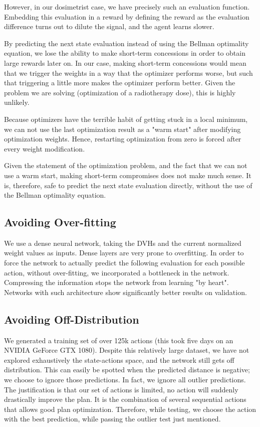 However, in our dosimetrist case, we have precisely such an evaluation function.
Embedding this evaluation in a reward by defining the reward as the evaluation difference turns out to dilute the signal, and the agent learns slower.

By predicting the next state evaluation instead of using the Bellman optimality equation, we lose the ability to make short-term concessions in order to obtain large rewards later on.
In our case, making short-term concessions would mean that we trigger the weights in a way that the optimizer performs worse, but such that triggering a little more makes the optimizer perform better.
Given the problem we are solving (optimization of a radiotherapy dose), this is highly unlikely.

Because optimizers have the terrible habit of getting stuck in a local minimum, we can not use the last optimization result as a "warm start" after modifying optimization weights.
Hence, restarting optimization from zero is forced after every weight modification.

Given the statement of the optimization problem, and the fact that we can not use a warm start, making short-term compromises does not make much sense.
It is, therefore, safe to predict the next state evaluation directly, without the use of the Bellman optimality equation.

\subsection{Avoiding Over-fitting}
We use a dense neural network, taking the DVHs and the current normalized weight values as inputs.
Dense layers are very prone to overfitting.
In order to force the network to actually predict the following evaluation for each possible action, without over-fitting, we incorporated a bottleneck in the network.
Compressing the information stops the network from learning "by heart".
Networks with such architecture show significantly better results on validation.

\subsection{Avoiding Off-Distribution}
We generated a training set of over 125k actions (this took five days on an NVIDIA GeForce GTX 1080).
Despite this relatively large dataset, we have not explored exhaustively the state-actions space, and the network still gets off distribution.
This can easily be spotted when the predicted distance is negative; we choose to ignore those predictions.
In fact, we ignore all outlier predictions.
The justification is that our set of actions is limited, no action will suddenly drastically improve the plan.
It is the combination of several sequential actions that allows good plan optimization.
Therefore, while testing, we choose the action with the best prediction, while passing the outlier test just mentioned.

